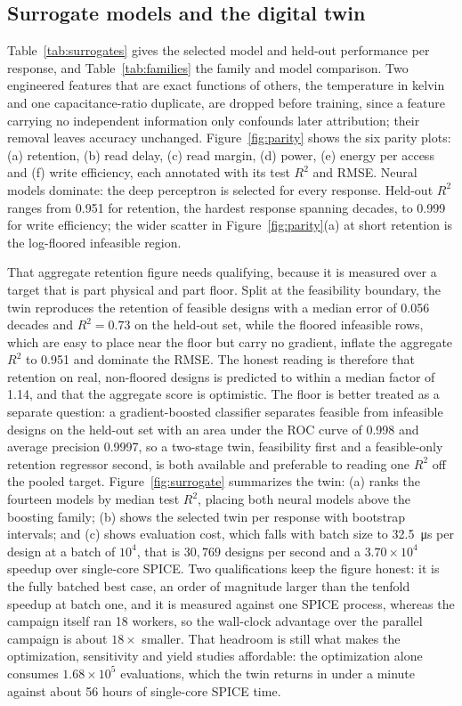 \documentclass[11pt,a4paper]{article}
\begin{document}
\subsection{Surrogate models and the digital twin}

Table~\ref{tab:surrogates} gives the selected model and held-out performance per
response, and Table~\ref{tab:families} the family and model comparison.
Two engineered features that are exact functions of others, the temperature in
kelvin and one capacitance-ratio duplicate, are dropped before training, since a
feature carrying no independent information only confounds later attribution; their
removal leaves accuracy unchanged. Figure~\ref{fig:parity} shows the six parity
plots: (a) retention, (b) read delay, (c) read margin, (d) power, (e) energy per
access and (f) write efficiency, each annotated with its test $R^{2}$ and RMSE.
Neural models dominate: the deep perceptron is selected for every response.
Held-out $R^{2}$ ranges from 0.951 for retention, the hardest response spanning
decades, to 0.999 for write efficiency; the wider scatter in
Figure~\ref{fig:parity}(a) at short retention is the log-floored infeasible
region.

That aggregate retention figure needs qualifying, because it is measured over a
target that is part physical and part floor. Split at the feasibility boundary, the
twin reproduces the retention of feasible designs with a median error of 0.056
decades and $R^{2}=0.73$ on the held-out set, while the floored infeasible rows,
which are easy to place near the floor but carry no gradient, inflate the aggregate
$R^{2}$ to 0.951 and dominate the RMSE. The honest reading is therefore that
retention on real, non-floored designs is predicted to within a median factor of
1.14, and that the aggregate score is optimistic. The floor is better treated as a
separate question: a gradient-boosted classifier separates feasible from infeasible
designs on the held-out set with an area under the ROC curve of 0.998 and average
precision 0.9997, so a two-stage twin, feasibility first and a feasible-only
retention regressor second, is both available and preferable to reading one
$R^{2}$ off the pooled target. Figure~\ref{fig:surrogate} summarizes the twin: (a) ranks the fourteen
models by median test $R^{2}$, placing both neural models above the boosting
family; (b) shows the selected twin per response with bootstrap intervals; and (c)
shows evaluation cost, which falls with batch size to \SI{32.5}{\micro\second} per
design at a batch of $10^{4}$, that is $30{,}769$ designs per second and a
$3.70\times10^{4}$ speedup over single-core SPICE. Two qualifications keep the
figure honest: it is the fully batched best case, an order of magnitude larger
than the tenfold speedup at batch one, and it is measured against one SPICE
process, whereas the campaign itself ran 18 workers, so the wall-clock advantage
over the parallel campaign is about $18\times$ smaller. That headroom is still what
makes the optimization, sensitivity and yield studies affordable: the optimization
alone consumes $1.68\times10^{5}$ evaluations, which the twin returns in under a
minute against about 56 hours of single-core SPICE time.
\end{document}
